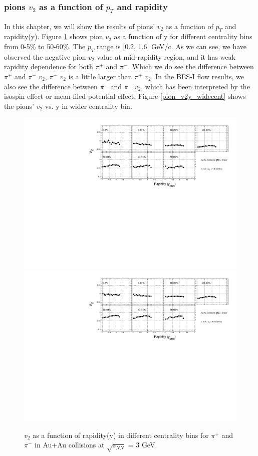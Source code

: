 \subsubsection{pions $v_{2}$ as a function of $p_{T}$ and rapidity}
In this chapter, we will show the results of pions' $v_{2}$ as a function of $p_{T}$ and rapidity(y).
Figure \ref{pion_v2y_cent} shows pion $v_{2}$ as a function of y for different centrality bins from 0-5\% to 50-60\%. The $p_{T}$ range is [0.2, 1.6] GeV/c. As we can see, we have observed the negative pion $v_{2}$ value at mid-rapidity region, and it has weak rapidity dependence for both $\pi^{+}$ and $\pi^{-}$. Which we do see the difference between $\pi^{+}$ and $\pi^{-}$ $v_{2}$, $\pi^{-}$ $v_{2}$ is a little larger than $\pi^{+}$ $v_{2}$. In the BES-I flow results, we also see the difference between $\pi^{+}$ and $\pi^{-}$ $v_{2}$, which has been interpreted by the isospin effect or mean-filed potential effect. Figure \ref{pion_v2y_widecent} shows the pions' $v_{2}$ vs. y in wider centrality bin.

\begin{figure}[h]
\includegraphics[scale=0.4]{chapter3/fig/v2ypikp/v2y_cent_pionp.pdf}
\includegraphics[scale=0.4]{chapter3/fig/v2ypikp/v2y_cent_pionm.pdf}
\caption{\label{pion_v2y_cent} $v_{2}$ as a function of rapidity(y) in different centrality bins for $\pi^{+}$ and $\pi^{-}$ in Au+Au collisions at $\sqrt{s_{NN}}$ = 3 GeV.}
\end{figure}

